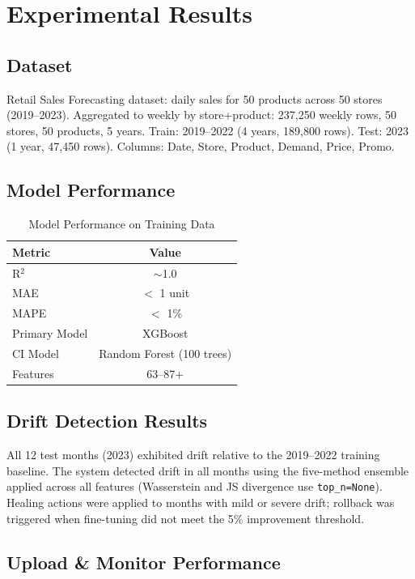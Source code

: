 \documentclass[conference]{IEEEtran}
\begin{document}
\section{Experimental Results}

\subsection{Dataset}

Retail Sales Forecasting dataset: daily sales for 50 products across 50 stores (2019--2023). Aggregated to weekly by store+product: 237,250 weekly rows, 50 stores, 50 products, 5 years. Train: 2019--2022 (4 years, 189,800 rows). Test: 2023 (1 year, 47,450 rows). Columns: Date, Store, Product, Demand, Price, Promo.

\subsection{Model Performance}

\begin{table}[htbp]
\caption{Model Performance on Training Data}
\centering
\begin{tabular}{|l|c|}
\hline
\textbf{Metric} & \textbf{Value} \\
\hline
R$^{2}$ & $\sim$1.0 \\
MAE & $<$ 1 unit \\
MAPE & $<$ 1\% \\
Primary Model & XGBoost \\
CI Model & Random Forest (100 trees) \\
Features & 63--87+ \\
\hline
\end{tabular}
\label{tab:metrics}
\end{table}

\subsection{Drift Detection Results}

All 12 test months (2023) exhibited drift relative to the 2019--2022 training baseline. The system detected drift in all months using the five-method ensemble applied across all features (Wasserstein and JS divergence use \texttt{top\_n=None}). Healing actions were applied to months with mild or severe drift; rollback was triggered when fine-tuning did not meet the 5\% improvement threshold.

\subsection{Upload \& Monitor Performance}
\end{document}
